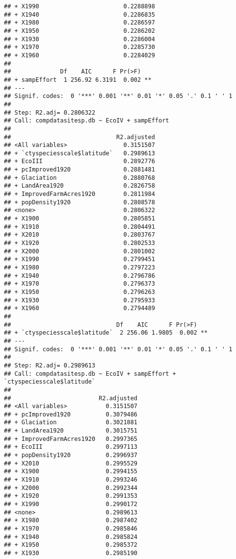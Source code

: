 \documentclass[
]{article}
\begin{document}
\begin{verbatim}
## + X1990                        0.2288898
## + X1940                        0.2286835
## + X1980                        0.2286597
## + X1950                        0.2286202
## + X1930                        0.2286004
## + X1970                        0.2285730
## + X1960                        0.2284029
## 
##              Df    AIC      F Pr(>F)   
## + sampEffort  1 256.92 6.3191  0.002 **
## ---
## Signif. codes:  0 '***' 0.001 '**' 0.01 '*' 0.05 '.' 0.1 ' ' 1
## 
## Step: R2.adj= 0.2806322 
## Call: compdatasitesp.db ~ EcoIV + sampEffort 
##  
##                              R2.adjusted
## <All variables>                0.3151507
## + `ctyspeciesscale$latitude`   0.2989613
## + EcoIII                       0.2892776
## + pcImproved1920               0.2881481
## + Glaciation                   0.2880768
## + LandArea1920                 0.2826758
## + ImprovedFarmAcres1920        0.2811984
## + popDensity1920               0.2808578
## <none>                         0.2806322
## + X1900                        0.2805851
## + X1910                        0.2804491
## + X2010                        0.2803767
## + X1920                        0.2802533
## + X2000                        0.2801002
## + X1990                        0.2799451
## + X1980                        0.2797223
## + X1940                        0.2796786
## + X1970                        0.2796373
## + X1950                        0.2796263
## + X1930                        0.2795933
## + X1960                        0.2794489
## 
##                              Df    AIC      F Pr(>F)   
## + `ctyspeciesscale$latitude`  2 256.06 1.9805  0.002 **
## ---
## Signif. codes:  0 '***' 0.001 '**' 0.01 '*' 0.05 '.' 0.1 ' ' 1
## 
## Step: R2.adj= 0.2989613 
## Call: compdatasitesp.db ~ EcoIV + sampEffort + `ctyspeciesscale$latitude` 
##  
##                         R2.adjusted
## <All variables>           0.3151507
## + pcImproved1920          0.3079486
## + Glaciation              0.3021881
## + LandArea1920            0.3015751
## + ImprovedFarmAcres1920   0.2997365
## + EcoIII                  0.2997113
## + popDensity1920          0.2996937
## + X2010                   0.2995529
## + X1900                   0.2994155
## + X1910                   0.2993246
## + X2000                   0.2992344
## + X1920                   0.2991353
## + X1990                   0.2990172
## <none>                    0.2989613
## + X1980                   0.2987402
## + X1970                   0.2985846
## + X1940                   0.2985824
## + X1950                   0.2985372
## + X1930                   0.2985190

\end{verbatim}
\end{document}
